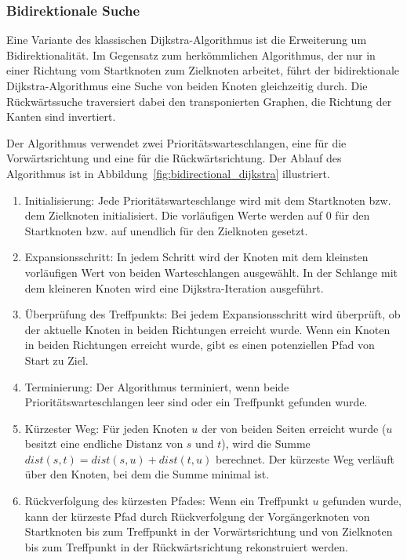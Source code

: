 \subsubsection{Bidirektionale Suche}
Eine Variante des klassischen Dijkstra-Algorithmus ist die Erweiterung um Bidirektionalität.
Im Gegensatz zum herkömmlichen Algorithmus, der nur in einer Richtung vom Startknoten zum Zielknoten
arbeitet, führt der bidirektionale Dijkstra-Algorithmus eine Suche von beiden Knoten gleichzeitig
durch. Die Rückwärtssuche traversiert dabei den transponierten Graphen, \dH die Richtung der Kanten
sind invertiert.

Der Algorithmus verwendet zwei Prioritätswarteschlangen, eine für die Vorwärtsrichtung und eine für
die Rückwärtsrichtung. Der Ablauf des Algorithmus ist in Abbildung~\ref{fig:bidirectional_dijkstra}
illustriert.

\begin{enumerate}
    \item Initialisierung: Jede Prioritätswarteschlange wird mit dem Startknoten bzw. dem Zielknoten
          initialisiert. Die vorläufigen Werte werden auf 0 für den Startknoten bzw. auf unendlich
          für den Zielknoten gesetzt.

    \item Expansionsschritt: In jedem Schritt wird der Knoten mit dem kleinsten vorläufigen Wert von
          beiden Warteschlangen ausgewählt. In der Schlange mit dem kleineren Knoten wird eine
          Dijkstra-Iteration ausgeführt.

    \item Überprüfung des Treffpunkts: Bei jedem Expansionsschritt wird überprüft, ob der aktuelle
          Knoten in beiden Richtungen erreicht wurde. Wenn ein Knoten in beiden Richtungen erreicht
          wurde, gibt es einen potenziellen Pfad von Start zu Ziel.

    \item Terminierung: Der Algorithmus terminiert, wenn beide Prioritätswarteschlangen
          leer sind oder ein Treffpunkt gefunden wurde.

    \item Kürzester Weg: Für jeden Knoten $u$ der von beiden Seiten erreicht wurde ($u$ besitzt eine
          endliche Distanz von $s$ und $t$), wird die Summe $dist(s,t) = dist(s,u) + dist(t,u)$
          berechnet. Der kürzeste Weg verläuft über den Knoten, bei dem die Summe minimal ist.

    \item Rückverfolgung des kürzesten Pfades: Wenn ein Treffpunkt $u$ gefunden wurde, kann der
          kürzeste Pfad durch Rückverfolgung der Vorgängerknoten von Startknoten bis zum Treffpunkt
          in der Vorwärtsrichtung und von Zielknoten bis zum Treffpunkt in der Rückwärtsrichtung
          rekonstruiert werden.
\end{enumerate}

